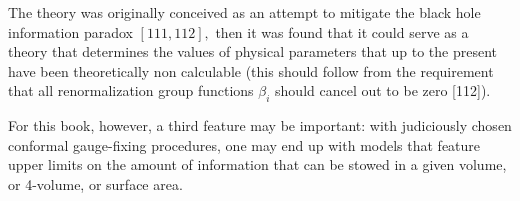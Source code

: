 \documentclass[main.tex]{subfiles}
\begin{document}
The theory was originally conceived as an attempt to mitigate the black hole information paradox $[111,112],$ then it was found that it could serve as a theory that determines the values of physical parameters that up to the present have been theoretically non calculable (this should follow from the requirement that all renormalization group functions $\beta_i$ should cancel out to be zero [112]). 

For this book, however, a third feature may be important: with judiciously chosen conformal gauge-fixing procedures, one may end up with models that feature upper limits on the amount of information that can be stowed in a given volume, or 4-volume, or surface area.




\subsection{}
\subsection{}
\subsection{}
\subsection{}
\subsection{}
\subsection{}
\subsection{}
\subsection{}




\begin{equation}\label{}
	
\end{equation}
\end{document}
